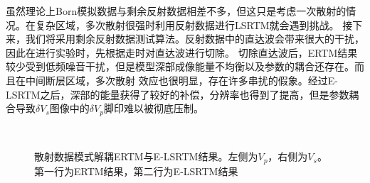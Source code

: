 虽然理论上Born模拟数据与剩余反射数据相差不多，但这只是考虑一次散射的情况。在复杂区域，多次散射很强时利用反射数据进行LSRTM就会遇到挑战。
接下来，我们将采用剩余反射数据测试算法。反射数据中的直达波会带来很大的干扰，因此在进行实验时，先根据走时对直达波进行切除。
切除直达波后，ERTM结果较少受到低频噪音干扰，但是模型深部成像能量不均衡以及参数的耦合还存在。而且在中间断层区域，多次散射
效应也很明显，存在许多串扰的假象。经过E-LSRTM之后，深部的能量获得了较好的补偿，分辨率也得到了提高，但是参数耦合导致$\delta
V_s$图像中的$\delta V_p$脚印难以被彻底压制。
\begin{figure}[!htb]
   \centering
   \\
   \caption{散射数据模式解耦ERTM与E-LSRTM结果。左侧为$V_p$，右侧为$V_s$。第一行为ERTM结果，第二行为E-LSRTM结果}
   \label{fig:LSRTM_1_refl}
\end{figure}

